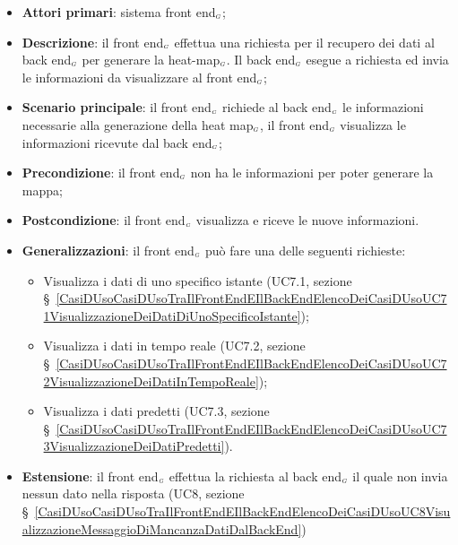 \begin{itemize}
	\item \textbf{Attori primari}: sistema front end$_{\scaleto{G}{3pt}}$;
	\item \textbf{Descrizione}: il front end$_{\scaleto{G}{3pt}}$ effettua una richiesta per il recupero dei dati al back end$_{\scaleto{G}{3pt}}$ per generare la heat-map$_{\scaleto{G}{3pt}}$. Il back end$_{\scaleto{G}{3pt}}$ esegue a richiesta ed invia le informazioni da visualizzare al front end$_{\scaleto{G}{3pt}}$;
	\item \textbf{Scenario principale}: il front end$_{\scaleto{G}{3pt}}$ richiede al back end$_{\scaleto{G}{3pt}}$ le informazioni necessarie alla generazione della heat map$_{\scaleto{G}{3pt}}$, il front end$_{\scaleto{G}{3pt}}$ visualizza le informazioni ricevute dal back end$_{\scaleto{G}{3pt}}$;
	\item \textbf{Precondizione}: il front end$_{\scaleto{G}{3pt}}$ non ha le informazioni per poter generare la mappa;
	\item \textbf{Postcondizione}: il front end$_{\scaleto{G}{3pt}}$ visualizza e riceve le nuove informazioni. 
	\item \textbf{Generalizzazioni}: il front end$_{\scaleto{G}{3pt}}$ può fare una delle seguenti richieste:
	\begin{itemize}
		\item Visualizza i dati di uno specifico istante (UC7.1, sezione \S~\ref{CasiDUsoCasiDUsoTraIlFrontEndEIlBackEndElencoDeiCasiDUsoUC71VisualizzazioneDeiDatiDiUnoSpecificoIstante});
		\item Visualizza i dati in tempo reale (UC7.2, sezione  \S~\ref{CasiDUsoCasiDUsoTraIlFrontEndEIlBackEndElencoDeiCasiDUsoUC72VisualizzazioneDeiDatiInTempoReale});
		\item Visualizza i dati predetti (UC7.3, sezione  \S~\ref{CasiDUsoCasiDUsoTraIlFrontEndEIlBackEndElencoDeiCasiDUsoUC73VisualizzazioneDeiDatiPredetti}).
	\end{itemize}
	\item \textbf{Estensione}: il front end$_{\scaleto{G}{3pt}}$ effettua la richiesta al back end$_{\scaleto{G}{3pt}}$ il quale non invia nessun dato nella risposta (UC8, sezione \S~\ref{CasiDUsoCasiDUsoTraIlFrontEndEIlBackEndElencoDeiCasiDUsoUC8VisualizzazioneMessaggioDiMancanzaDatiDalBackEnd})
\end{itemize}

